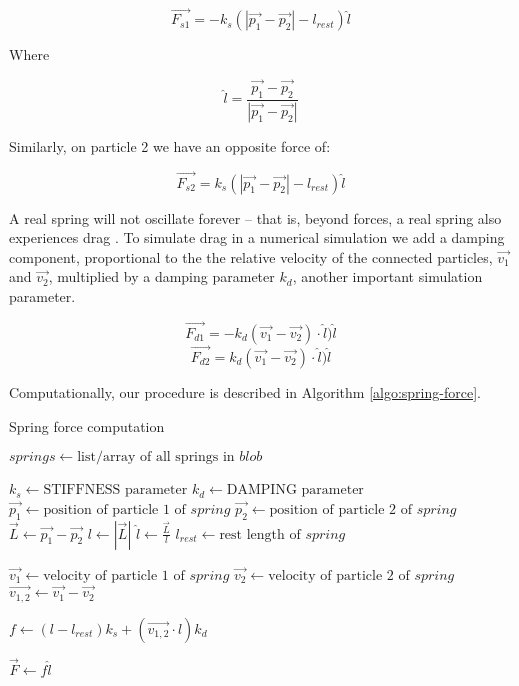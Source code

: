\documentclass[manuscript, screen]{timtm}
\begin{document}
\[\vec{F_{s1}} = -k_s (|\vec{p_1} - \vec{p_2}| - l_{rest}) \hat{l} \]

Where 

\[\hat{l} = \frac{\vec{p_1} - \vec{p_2}}{|\vec{p_1} - \vec{p_2}|} \]

Similarly, on particle 2 we have an opposite force of:

\[\vec{F_{s2}} = k_s (|\vec{p_1} - \vec{p_2}| - l_{rest}) \hat{l} \]

A real spring will not oscillate forever -- that is, beyond forces, a real spring also experiences drag \cite{game-physics-millington}. To simulate drag in a numerical simulation we add a damping component, proportional to the the relative velocity of the connected particles, $\vec{v_1}$ and $\vec{v_2}$, multiplied by a damping parameter $k_d$, another important simulation parameter.

\[\vec{F_{d1}} = -k_d (\vec{v_1} - \vec{v_2}) \cdot \hat{l} ) \hat{l} \]
\[\vec{F_{d2}} =  k_d (\vec{v_1} - \vec{v_2}) \cdot \hat{l} ) \hat{l} \]

Computationally, our procedure is described in Algorithm \ref{algo:spring-force}.

\begin{algorithm}
\caption{Spring force computation} \label{algo:spring-force}
\begin{algorithmic}[1]


    \State $springs \gets \text{list/array of all springs in } blob$

        \State $k_s \gets \text{STIFFNESS parameter}$
        \State $k_d \gets \text{DAMPING parameter}$
        \State $\vec{p_1} \gets \text{position of particle 1 of }spring$
        \State $\vec{p_2} \gets \text{position of particle 2 of }spring$
        \State $\vec{L} \gets \vec{p_1} - \vec{p_2}$
        \State $l \gets |\vec{L}|$ 
        \State $\hat{l} \gets \frac{\vec{L}}{l}$
        \State $l_{rest} \gets \text{rest length of }spring$

        \State $\vec{v_1} \gets \text{velocity of particle 1 of }spring$
        \State $\vec{v_2} \gets \text{velocity of particle 2 of }spring$
        \State $\vec{v_{1,2}} \gets \vec{v_1} - \vec{v_2}$

        \State $f \gets (l - l_{rest}) k_s + (\vec{v_{1,2}} \cdot \hat{l}) k_d $

        \State $\vec{F} \gets f \hat{l}$

        \State {}
        \State {}
        \State {} 
        
    \EndFor
\EndFor
\end{algorithmic}
\end{algorithm}
\end{document}
